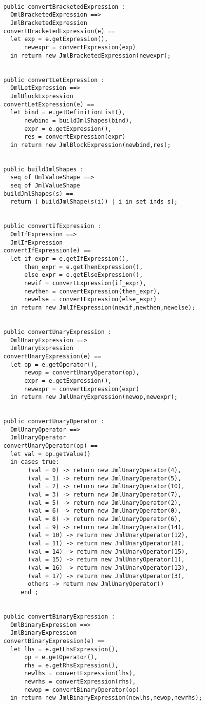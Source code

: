 \begin{lstlisting}
  
public convertBracketedExpression :
  OmlBracketedExpression ==>
  JmlBracketedExpression
convertBracketedExpression(e) ==
  let exp = e.getExpression(),
      newexpr = convertExpression(exp)
  in return new JmlBracketedExpression(newexpr);
  
  
public convertLetExpression :
  OmlLetExpression ==>
  JmlBlockExpression
convertLetExpression(e) ==
  let bind = e.getDefinitionList(),
      newbind = buildJmlShapes(bind),
	  expr = e.getExpression(),
	  res = convertExpression(expr)
  in return new JmlBlockExpression(newbind,res);
  
  
public buildJmlShapes :
  seq of OmlValueShape ==>
  seq of JmlValueShape
buildJmlShapes(s) ==
  return [ buildJmlShape(s(i)) | i in set inds s];
  
  
public convertIfExpression :
  OmlIfExpression ==>
  JmlIfExpression
convertIfExpression(e) ==
  let if_expr = e.getIfExpression(),
      then_expr = e.getThenExpression(),
	  else_expr = e.getElseExpression(),
	  newif = convertExpression(if_expr),
	  newthen = convertExpression(then_expr),
	  newelse = convertExpression(else_expr)
  in return new JmlIfExpression(newif,newthen,newelse);
  
  
public convertUnaryExpression :
  OmlUnaryExpression ==>
  JmlUnaryExpression
convertUnaryExpression(e) ==
  let op = e.getOperator(),
      newop = convertUnaryOperator(op),
	  expr = e.getExpression(),
	  newexpr = convertExpression(expr)
  in return new JmlUnaryExpression(newop,newexpr);
  
  
public convertUnaryOperator :
  OmlUnaryOperator ==>
  JmlUnaryOperator
convertUnaryOperator(op) == 
  let val = op.getValue()
  in cases true:
       (val = 0) -> return new JmlUnaryOperator(4),
	   (val = 1) -> return new JmlUnaryOperator(5),
	   (val = 2) -> return new JmlUnaryOperator(10),
	   (val = 3) -> return new JmlUnaryOperator(7),
	   (val = 5) -> return new JmlUnaryOperator(2),
	   (val = 6) -> return new JmlUnaryOperator(0),
	   (val = 8) -> return new JmlUnaryOperator(6),
	   (val = 9) -> return new JmlUnaryOperator(14),
	   (val = 10) -> return new JmlUnaryOperator(12),
	   (val = 11) -> return new JmlUnaryOperator(8),
	   (val = 14) -> return new JmlUnaryOperator(15),
	   (val = 15) -> return new JmlUnaryOperator(1),
	   (val = 16) -> return new JmlUnaryOperator(13),
	   (val = 17) -> return new JmlUnaryOperator(3),
	   others -> return new JmlUnaryOperator()
     end ;
  
  
public convertBinaryExpression :
  OmlBinaryExpression ==>
  JmlBinaryExpression
convertBinaryExpression(e) ==
  let lhs = e.getLhsExpression(),
      op = e.getOperator(),
	  rhs = e.getRhsExpression(),
	  newlhs = convertExpression(lhs),
	  newrhs = convertExpression(rhs),
	  newop = convertBinaryOperator(op)
  in return new JmlBinaryExpression(newlhs,newop,newrhs);
  

\end{lstlisting}
